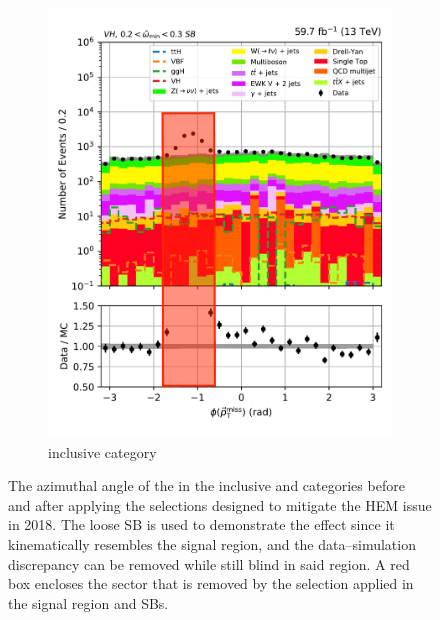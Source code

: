 \begin{figure}[htbp]
\begin{subfigure}[b]{0.34\textwidth}
    \end{subfigure}
    \hspace{0.05\textwidth}
    \begin{subfigure}[b]{0.34\textwidth}
        \includegraphics[width=\textwidth]{figures/hem_issue/sideband_4/met_phi/met_phi_VH_before_annotated.pdf}
        \caption{\VH inclusive category}
    \end{subfigure}
    \caption[The azimuthal angle of the \ptvecmiss in the inclusive \ttH and \VH categories before and after applying the selections designed to mitigate the HEM issue in 2018]{The azimuthal angle of the \ptvecmiss in the inclusive \ttH and \VH categories before and after applying the selections designed to mitigate the HEM issue in 2018. The loose \omegaTilde \gls{SB} is used to demonstrate the effect since it kinematically resembles the signal region, and the data--simulation discrepancy can be removed while still blind in said region. A red box encloses the sector that is removed by the selection applied in the signal region and \glspl{SB}.}
    \label{fig:htoinv_hem_issue_met_phi}
\end{figure}

